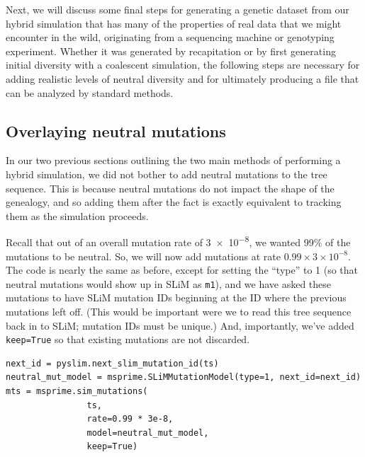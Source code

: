 \documentclass[12pt]{article}
\begin{document}
Next, we will discuss some final steps for generating a genetic dataset from our hybrid simulation that has many of the properties of real data that we might
encounter in the wild, originating from a sequencing machine or genotyping experiment. Whether it was generated by recapitation or by first generating initial
diversity with a coalescent simulation, the following steps are necessary for adding realistic levels of neutral diversity and for ultimately producing a
file that can be analyzed by standard methods.

\subsection {Overlaying neutral mutations}

In our two previous sections outlining the two main methods of performing a hybrid simulation, we did not bother to add neutral mutations to the tree sequence.
This is because neutral mutations do not impact the shape of the genealogy, and so adding them after the fact is exactly equivalent to tracking them as the
simulation proceeds.



Recall that out of an overall mutation rate of \num{3e-8},
we wanted 99\% of the mutations to be neutral.
So, we will now add mutations at rate $0.99 \times 3 \times10^{-8}$.
The code is nearly the same as before,
except for setting the ``type'' to 1
(so that neutral mutations would show up in SLiM as \verb|m1|),
and we have asked these mutations to have SLiM mutation IDs beginning at the ID where the previous mutations left off.
(This would be important were we to read this tree sequence back in to SLiM;
mutation IDs must be unique.)
And, importantly, we’ve added \verb|keep=True| so that existing mutations are not discarded.
\begin{listing}[H]
    \begin{verbatim}
next_id = pyslim.next_slim_mutation_id(ts)
neutral_mut_model = msprime.SLiMMutationModel(type=1, next_id=next_id)
mts = msprime.sim_mutations(
                ts,
                rate=0.99 * 3e-8,
                model=neutral_mut_model,
                keep=True)
    \end{verbatim}
\end{listing}
\end{document}
